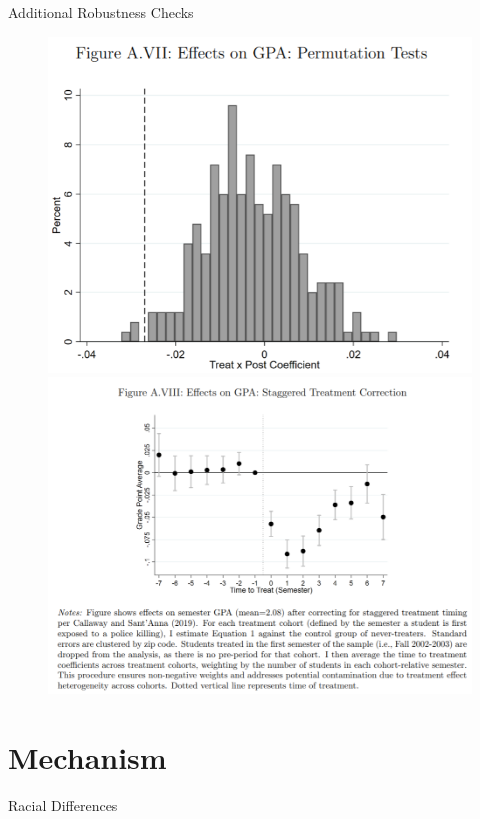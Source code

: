 \documentclass[dvipdfmx]{beamer}
\begin{document}
\begin{frame}{Additional Robustness Checks}
  \begin{figure}
    \centering
    \includegraphics[scale = .4]{fig_tab/os20220113/FA7.png}
    \includegraphics[scale = .4]{fig_tab/os20220113/FA8.png}
  \end{figure}
\end{frame}

\section{Mechanism}
\frame{\sectionpage}

\begin{frame}{Racial Differences}
  
\end{frame}
\end{document}
